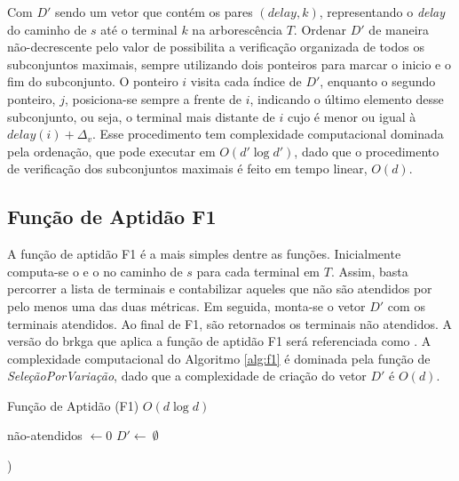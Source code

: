 Com $D'$ sendo um  vetor que contém os pares $(delay,  k)$, representando o {\em
delay} do caminho de  $s$ até o terminal $k$ na  arborescência $T$. Ordenar $D'$
de  maneira não-decrescente  pelo valor  de {\delay}  possibilita a  verificação
organizada de todos  os subconjuntos maximais, sempre  utilizando dois ponteiros
para marcar o inicio  e o fim do subconjunto. O ponteiro  $i$ visita cada índice
de $D'$, enquanto o segundo ponteiro,  $j$, posiciona-se sempre a frente de $i$,
indicando o último elemento desse subconjunto, ou seja, o terminal mais distante
de $i$ cujo {\delay} é menor ou igual à $delay(i) + \Delta_v$. Esse procedimento
tem complexidade  computacional dominada  pela ordenação,  que pode  executar em
$O(d'  \log  d')$, dado  que  o  procedimento  de verificação  dos  subconjuntos
maximais é feito em tempo linear, $O(d)$.

\subsection{Função de Aptidão F1} \label{subsec:brkga-f1}

A  função  de aptidão  F1  é  a mais  simples  dentre  as funções.  Inicialmente
computa-se o {\delay} e o {\jitter} no caminho de $s$ para cada terminal em $T$.
Assim, basta percorrer  a lista de terminais e contabilizar  aqueles que não são
atendidos por  pelo menos uma  das duas métricas.  Em seguida, monta-se  o vetor
$D'$ com os terminais atendidos. Ao final de F1, são retornados os terminais não
atendidos.  A versão  do \gls{brkga}  que  aplica a  função de  aptidão F1  será
referenciada   como  {\bfum}.   A   complexidade   computacional  do   Algoritmo
\ref{alg:f1}  é dominada  pela função  de {\em  SeleçãoPorVariação}, dado  que a
complexidade de criação do vetor $D'$ é $O(d)$.

\begin{algorithm}[!ht]
  \caption{Função de Aptidão (F1) $O(d \log d)$ \label{alg:f1}}

  não-atendidos $\leftarrow 0$\;
  $D' \leftarrow \ \emptyset$

  
  )\;
\end{algorithm}

